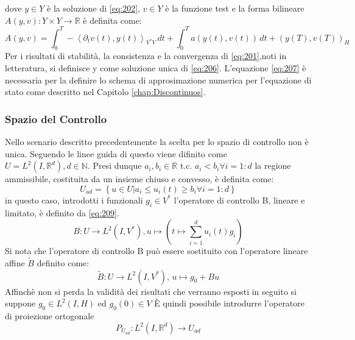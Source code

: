 dove $y{\in}Y$ è la soluzione di \ref{eq:202}, $v{\in}Y$ è la funzione test e la forma bilineare $A(y,v): Y{\times}Y\rightarrow\mathbb{R}$ è definita come:
\begin{equation}
 A(y,v) = \int_{0}^{T} -\left \langle {\partial_{t}}v(t),y(t) \right \rangle_{V^*V} \, dt + \int_{0}^{T} a(y(t),v(t)) \, dt + (y(T),v(T))_H
\label{eq:207}
\end{equation}
Per i risultati di stabilità, la consistenza e la convergenza di \ref{eq:201},noti in letteratura, si definisce y come soluzione unica di \ref{eq:206}. L'equazione \ref{eq:207} è necessaria per la definire  lo schema di approsimazione numerica per l'equazione di stato come descritto nel Capitolo \ref{chap:Discontinuos}.

\subsubsection{Spazio del Controllo}
Nello scenario descritto precedentemente la scelta per lo spazio di controllo non è unica. Seguendo le linee guida di \cite{MAIN} questo viene difinito come $U = L^2(I,\mathbb{R}^d), d \in \mathbb{N}$. Presi dunque $a_i, b_i \in \mathbb{R}$ t.c. $a_i<b_i {\forall}i=1:d$ la regione ammissibile, costituita da un insieme chiuso e convesso, è definita come:
\begin{equation}
U_{ad} = \left\{ u \in U | a_i \leq u_i(t) \geq b_i {\forall}i=1:d  \right\}
\label{eq:208}
\end{equation}
in questo caso, introdotti i funzionali $g_i \in V^*$ l'operatore di controllo B, lineare e limitato, è definito da \ref{eq:209}.
\begin{equation}
B : U \rightarrow L^2(I,V^*), u\mapsto \left( t\mapsto\sum_{i=1}^d u_i(t)g_i \right)
\label{eq:209}
\end{equation}
Si nota che l'operatore di controllo B può essere sostituito con l'operatore lineare affine $\tilde{B}$ definito come:
\begin{equation}
\tilde{B} : U \rightarrow L^2(I,V^*) \text{, } u\mapsto g_0 + Bu
\label{eq:210}
\end{equation}
Affinchè non si perda la validità dei risultati che verranno esposti in seguito si suppone $g_0 \in L^2(I,H)$ ed $g_0(0) \in V$
\MakeUppercase{è} quindi possibile introdurre l'operatore di proiezione ortogonale 
\begin{equation}
P_{U_{ad}} : L^2(I,\mathbb{R}^d)\rightarrow U_{ad}
\label{eq:211}
\end{equation}


